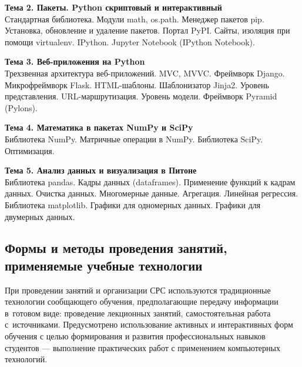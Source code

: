 \documentclass[a4paper,12pt]{article}
\begin{document}
\textbf{Тема 2. Пакеты. Python скриптовый и интерактивный  }\\
Стандартная библиотека. Модули math, os.path. Менеджер пакетов pip.
Установка, обновление и удаление пакетов. Портал PyPI. Сайты,
изоляция при помощи virtualenv. IPython. Jupyter Notebook (IPython
Notebook).

\textbf{Тема 3. Веб-приложения на Python                   }\\
Трехзвенная архитектура веб-приложений. MVC, MVVC. Фреймворк Django.
Микрофреймворк Flask. HTML-шаблоны. Шаблонизатор Jinja2.
Уровень представления. URL-маршрутизация. Уровень модели. Фреймворк
Pyramid (Pylons).

\textbf{Тема 4. Математика в пакетах NumPy и SciPy         }\\
Библиотека NumPy. Матричные операции в NumPy. Библиотека SciPy.
Оптимизация.

\textbf{Тема 5. Анализ данных и визуализация в Питоне      }\\
Библиотека pandas. Кадры данных  (dataframes). Применение функций к
кадрам данных. Очистка данных. Многомерные данные. Агрегация.
Линейная регрессия.  Библиотека matplotlib. Графики для одномерных
данных. Графики для двумерных данных.
 

\subsection{Формы и методы проведения занятий, применяемые учебные технологии}
При проведении занятий и организации СРС используются традиционные технологии сообщающего обучения, предполагающие передачу информации в~готовом виде: проведение лекционных занятий, самостоятельная работа с~источниками. Предусмотрено использование активных и интерактивных форм обучения с целью формирования и развития профессиональных навыков студентов --- выполнение практических работ с применением компьютерных технологий. 
\end{document}
